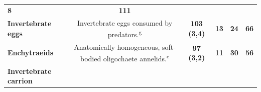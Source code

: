 \documentclass[11pt]{article}
\begin{document}
\begin{longtable}[]{@{}lccccc@{}}
\begin{minipage}[t]{0.04\columnwidth}
\textbf{8}\strut
\end{minipage} & \begin{minipage}[t]{0.04\columnwidth}\centering
\textbf{111}\strut
\end{minipage}\tabularnewline
\begin{minipage}[t]{0.11\columnwidth}\raggedright
\textbf{Invertebrate eggs}\strut
\end{minipage} & \begin{minipage}[t]{0.45\columnwidth}\centering
Invertebrate eggs consumed by predators.\textsuperscript{g}\strut
\end{minipage} & \begin{minipage}[t]{0.14\columnwidth}\centering
\textbf{103 (3,4)}\strut
\end{minipage} & \begin{minipage}[t]{0.04\columnwidth}\centering
\textbf{13}\strut
\end{minipage} & \begin{minipage}[t]{0.04\columnwidth}\centering
\textbf{24}\strut
\end{minipage} & \begin{minipage}[t]{0.04\columnwidth}\centering
\textbf{66}\strut
\end{minipage}\tabularnewline
\begin{minipage}[t]{0.11\columnwidth}\raggedright
\textbf{Enchytraeids}\strut
\end{minipage} & \begin{minipage}[t]{0.45\columnwidth}\centering
Anatomically homogeneous, soft-bodied oligochaete
annelids.\textsuperscript{c}\strut
\end{minipage} & \begin{minipage}[t]{0.14\columnwidth}\centering
\textbf{97 (3,2)}\strut
\end{minipage} & \begin{minipage}[t]{0.04\columnwidth}\centering
\textbf{11}\strut
\end{minipage} & \begin{minipage}[t]{0.04\columnwidth}\centering
\textbf{30}\strut
\end{minipage} & \begin{minipage}[t]{0.04\columnwidth}\centering
\textbf{56}\strut
\end{minipage}\tabularnewline
\begin{minipage}[t]{0.11\columnwidth}\raggedright
\textbf{Invertebrate carrion}\strut
\end{minipage} & \begin{minipage}[t]{0.45\columnwidth}\centering

\end{minipage}
\end{longtable}
\end{document}
